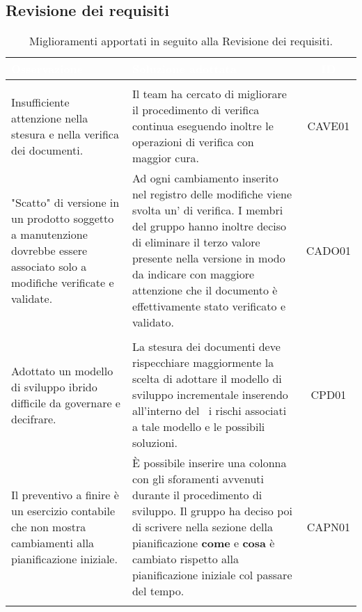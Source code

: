 \subsection{Revisione dei requisiti}
\centering
	\begin{longtable}{|C{4cm}|C{8cm}|c|}
		\caption{\label{tab:Criticità}Miglioramenti apportati in seguito alla Revisione dei requisiti.}\\
		\textcolor{white}{\textbf{Osservazione}}&
		\textcolor{white}{\textbf{Soluzione adottata}}&
		\textcolor{white}{\textbf{ID}}\\ \hline
		\\ \hline
		Insufficiente attenzione nella stesura e nella verifica dei documenti. & Il team ha cercato di migliorare il procedimento di verifica continua eseguendo inoltre le operazioni di verifica con maggior cura. & CAVE01\\ \hline %
		"Scatto" di versione in un prodotto soggetto a manutenzione dovrebbe essere associato solo a modifiche verificate e validate. & Ad ogni cambiamento inserito nel registro delle modifiche viene svolta un' di verifica. I membri del gruppo hanno inoltre deciso di eliminare il terzo valore presente nella versione in modo da indicare con maggiore attenzione che il documento è effettivamente stato verificato e validato. & CADO01\\ \hline %
		\\ \hline
		Adottato un modello di sviluppo ibrido difficile da governare e decifrare. & La stesura dei documenti deve rispecchiare maggiormente la scelta di adottare il modello di sviluppo incrementale inserendo all'interno del \PdP\ i rischi associati a tale modello e le possibili soluzioni. & CPD01\\ \hline %
		Il preventivo a finire è un esercizio contabile che non mostra cambiamenti alla pianificazione iniziale. & È possibile inserire una colonna con gli sforamenti avvenuti durante il procedimento di sviluppo. Il gruppo ha deciso poi di scrivere nella sezione della pianificazione \textbf{come} e \textbf{cosa} è cambiato rispetto alla pianificazione iniziale col passare del tempo. & CAPN01\\ \hline %
		\\ \hline

\end{longtable}
